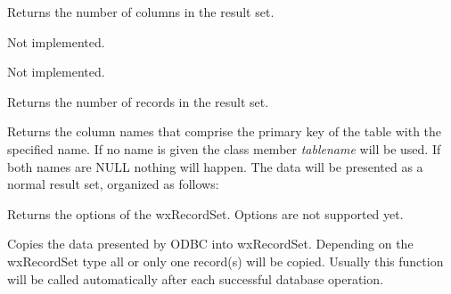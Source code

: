 

Returns the number of columns in the result set.
  


Not implemented.



Not implemented.



Returns the number of records in the result set.
  


Returns the column names that comprise the primary key of the table with the specified name. If no name is
given the class member {\it tablename} will be used. If both names are NULL
nothing will happen. The data will be presented as a normal result set, organized
as follows:

\begin{twocollist}\itemsep=0pt
\end{twocollist}



Returns the options of the wxRecordSet. Options are not supported yet.



Copies the data presented by ODBC into wxRecordSet. Depending on the
wxRecordSet type all or only one record(s) will be copied.
Usually this function will be called automatically after each successful
database operation.
  

